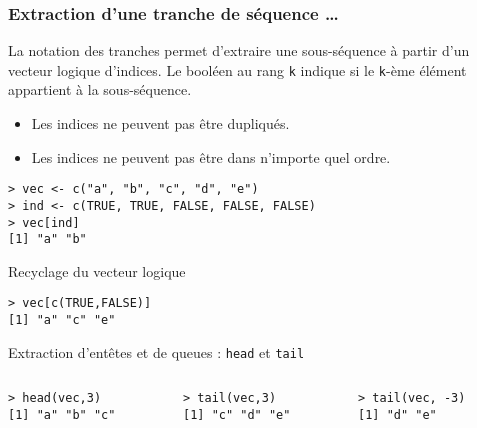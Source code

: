 \documentclass[10pt]{beamer}
\begin{document}
\begin{frame}[fragile]
  \frametitle{Extraction d'une tranche de séquence \dots}
  La notation des tranches permet d’extraire une sous-séquence à partir d’un \alert{vecteur logique d’indices}.
  Le booléen au rang \texttt{k} indique si le \texttt{k}-ème élément appartient à la sous-séquence.
  \begin{itemize}
  \item Les indices ne peuvent pas être dupliqués.
  \item Les indices ne peuvent pas être dans n'importe quel ordre.  
  \end{itemize}
  \begin{lstlisting}
> vec <- c("a", "b", "c", "d", "e")
> ind <- c(TRUE, TRUE, FALSE, FALSE, FALSE)
> vec[ind]
[1] "a" "b"
\end{lstlisting}

\begin{block}{Recyclage du vecteur logique}
  \begin{lstlisting}[style=block]
> vec[c(TRUE,FALSE)]
[1] "a" "c" "e"    
  \end{lstlisting}
\end{block}
\begin{block}{Extraction d'entêtes et de queues : \texttt{head} et \texttt{tail}}

  
\begin{columns}[t]
\begin{column}{0.33\textwidth}
  \begin{lstlisting}
> head(vec,3)
[1] "a" "b" "c"
\end{lstlisting}
\end{column}
\begin{column}{0.33\textwidth}
  \begin{lstlisting}
> tail(vec,3)
[1] "c" "d" "e"
\end{lstlisting}
\end{column}
\begin{column}{0.33\textwidth}
  \begin{lstlisting}
> tail(vec, -3)
[1] "d" "e"
\end{lstlisting}
\end{column}
\end{columns}
\end{block}
\end{frame}
\end{document}
